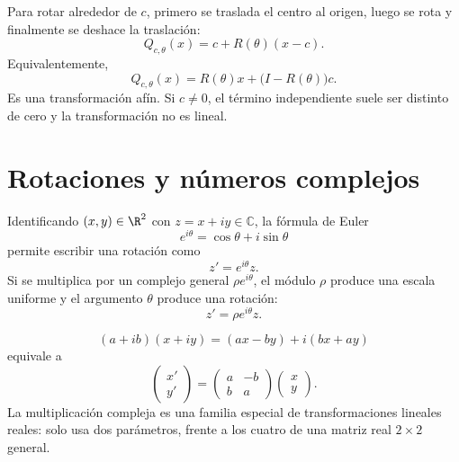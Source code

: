 Para rotar alrededor de \(c\), primero se traslada el centro al origen, luego se rota y
finalmente se deshace la traslación:
\[
  \boxed{Q_{c,\theta}(x)=c+R(\theta)(x-c)}.
\]
Equivalentemente,
\[
  Q_{c,\theta}(x)=R(\theta)x+\bigl(I-R(\theta)\bigr)c.
\]
Es una transformación afín. Si \(c\neq0\), el término independiente suele ser distinto de
cero y la transformación no es lineal.

\begin{center}
\end{center}

\section{Rotaciones y números complejos}\label{sec:rot-complejos}

Identificando \((x,y)\in\R^2\) con \(z=x+iy\in\mathbb C\), la fórmula de Euler
\[
  e^{i\theta}=\cos\theta+i\sin\theta
\]
permite escribir una rotación como
\[
  z'=e^{i\theta}z.
\]
Si se multiplica por un complejo general \(\rho e^{i\theta}\), el módulo \(\rho\) produce
una escala uniforme y el argumento \(\theta\) produce una rotación:
\[
  z'=\rho e^{i\theta}z.
\]

\begin{idea}
\[
(a+ib)(x+iy)=(ax-by)+i(bx+ay)
\]
equivale a
\[
\begin{pmatrix}x'\\y'\end{pmatrix}
=
\begin{pmatrix}a&-b\\b&a\end{pmatrix}
\begin{pmatrix}x\\y\end{pmatrix}.
\]
La multiplicación compleja es una familia especial de transformaciones lineales reales:
solo usa dos parámetros, frente a los cuatro de una matriz real \(2\times2\) general.
\end{idea}

